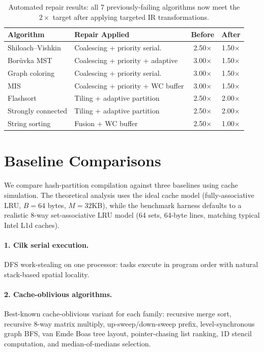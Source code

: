 \documentclass[11pt]{article}
\begin{document}
\begin{table}[t]
\centering
\caption{Automated repair results: all 7 previously-failing algorithms
  now meet the $2\times$ target after applying targeted IR transformations.}
\label{tab:repair}
\begin{tabular}{@{}llcc@{}}
\toprule
\textbf{Algorithm} & \textbf{Repair Applied} & \textbf{Before} & \textbf{After} \\
\midrule
Shiloach--Vishkin & Coalescing + priority serial. & 2.50$\times$ & 1.50$\times$ \\
Bor\r{u}vka MST & Coalescing + priority + adaptive & 3.00$\times$ & 1.50$\times$ \\
Graph coloring & Coalescing + priority serial. & 3.00$\times$ & 1.50$\times$ \\
MIS & Coalescing + priority + WC buffer & 3.00$\times$ & 1.50$\times$ \\
Flashsort & Tiling + adaptive partition & 2.50$\times$ & 2.00$\times$ \\
Strongly connected & Tiling + adaptive partition & 2.50$\times$ & 2.00$\times$ \\
String sorting & Fusion + WC buffer & 2.50$\times$ & 1.00$\times$ \\
\bottomrule
\end{tabular}
\end{table}

\section{Baseline Comparisons}
\label{sec:baselines}

We compare hash-partition compilation against three baselines using
cache simulation.  The theoretical analysis uses the ideal cache model
(fully-associative LRU, $B = 64$ bytes, $M = 32$KB), while the
benchmark harness defaults to a realistic 8-way set-associative LRU
model (64 sets, 64-byte lines, matching typical Intel L1d caches).

\paragraph{1. Cilk serial execution.}
DFS work-stealing on one processor: tasks execute in program order with
natural stack-based spatial locality.

\paragraph{2. Cache-oblivious algorithms.}
Best-known cache-oblivious variant for each family: recursive merge sort,
recursive 8-way matrix multiply, up-sweep/down-sweep prefix,
level-synchronous graph BFS, van Emde Boas tree layout, pointer-chasing
list ranking, 1D stencil computation, and median-of-medians selection.
\end{document}
